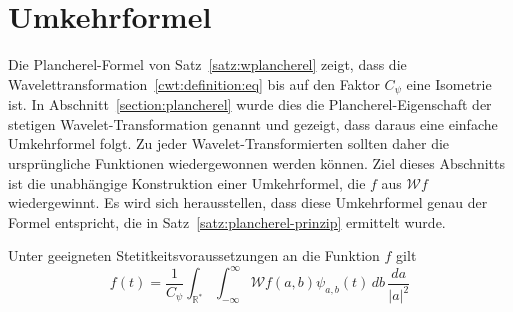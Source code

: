 %
%
%
\section{Umkehrformel%
\label{section:cwt:umkehrformel}}
Die Plancherel-Formel von Satz~\ref{satz:wplancherel} zeigt, dass die
Wavelettransformation~\eqref{cwt:definition:eq} bis auf den Faktor
$C_{\psi}$ eine Isometrie ist.
In Abschnitt~\ref{section:plancherel} wurde dies die Plancherel-Eigenschaft
der stetigen Wavelet-Transformation genannt und gezeigt, dass daraus
eine einfache Umkehrformel folgt.
Zu jeder Wavelet-Transformierten sollten daher die ursprüngliche
Funktionen wiedergewonnen werden können.
Ziel dieses Abschnitts ist die unabhängige Konstruktion einer Umkehrformel, 
die $f$ aus $\mathcal{W}f$ wiedergewinnt.
Es wird sich herausstellen, dass diese Umkehrformel genau der Formel
entspricht, die in Satz~\ref{satz:plancherel-prinzip} ermittelt wurde.

\begin{satz}
Unter geeigneten Stetitkeitsvoraussetzungen an die Funktion $f$ gilt
\begin{equation}
f(t) = \frac{1}{C_{\psi}}\int_{\mathbb R^*}\int_{-\infty}^\infty
\mathcal{W}f(a,b) \psi_{a,b}(t)
\,db\,\frac{da}{|a|^2}
\label{cwt:umkehr}
\end{equation}
\end{satz}

